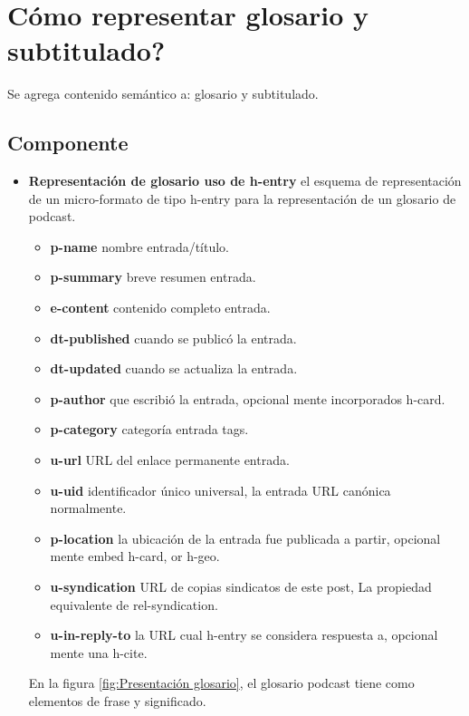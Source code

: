 \section{\textquestiondown Cómo representar glosario y subtitulado?}

Se agrega contenido semántico a: glosario y subtitulado. 

\subsection{Componente}

\begin{itemize}

\item \textbf{Representación de glosario uso de h-entry}
el esquema de representación de un micro-formato de tipo h-entry para la
representación de un glosario de podcast. \cite{hEntry}

\begin{itemize}

\item \textbf{p-name} nombre entrada/título.
\item \textbf{p-summary} breve resumen entrada.
\item \textbf{e-content} contenido completo entrada.
\item \textbf{dt-published} cuando se publicó la entrada.
\item \textbf{dt-updated} cuando se actualiza la entrada.
\item \textbf{p-author} que escribió la entrada, opcional mente incorporados
h-card.
\item \textbf{p-category} categoría entrada tags.
\item \textbf{u-url} URL del enlace permanente entrada.
\item \textbf{u-uid} identificador único universal, la entrada URL canónica
normalmente.
\item \textbf{p-location} la ubicación de la entrada fue publicada a partir,
opcional mente embed h-card, or h-geo.
\item \textbf{u-syndication} URL de copias sindicatos de este post, La propiedad
equivalente de rel-syndication.
\item \textbf{u-in-reply-to} la URL cual h-entry se considera respuesta a, 
opcional mente una h-cite.

\end{itemize}

En la figura \ref{fig:Presentación glosario}, el glosario podcast tiene como
elementos de frase y significado. 


\end{itemize}
